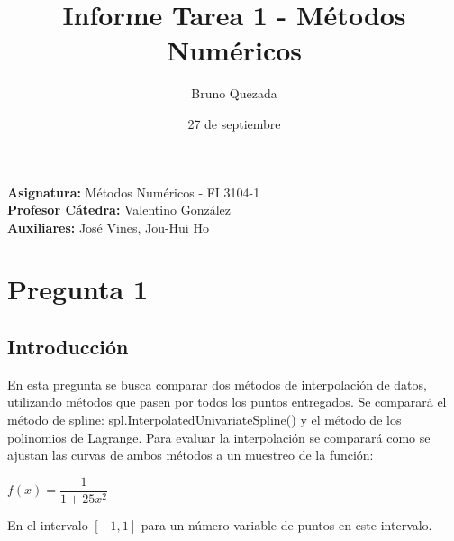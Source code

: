 \documentclass[10pt,a4paper]{article}
\title{Informe Tarea 1 - M\'etodos Num\'ericos}
\author{Bruno Quezada}
\date{27 de septiembre}
\begin{document}
\maketitle

\vspace{17cm}
\begin{flushright}
\textbf{Asignatura:} Métodos Numéricos - FI 3104-1\\
\textbf{Profesor Cátedra:} Valentino González\\
\textbf{Auxiliares:} José Vines, Jou-Hui Ho \\
\end{flushright}
\pagebreak

\section{Pregunta 1}
\noindent
\subsection{Introducción}


En esta pregunta se busca comparar dos métodos de interpolación de datos, utilizando métodos que pasen por todos los puntos entregados. Se comparará el método de spline: spl.InterpolatedUnivariateSpline() y el método de los polinomios de Lagrange. Para evaluar la interpolación se comparará como se ajustan las curvas de ambos métodos a un muestreo de la función:\\
\begin{center}
$f(x) = \dfrac{1}{1 + 25x^2}$\\
\end{center}
En el intervalo $[-1,1]$ para un número variable de puntos en este intervalo.
\end{document}

